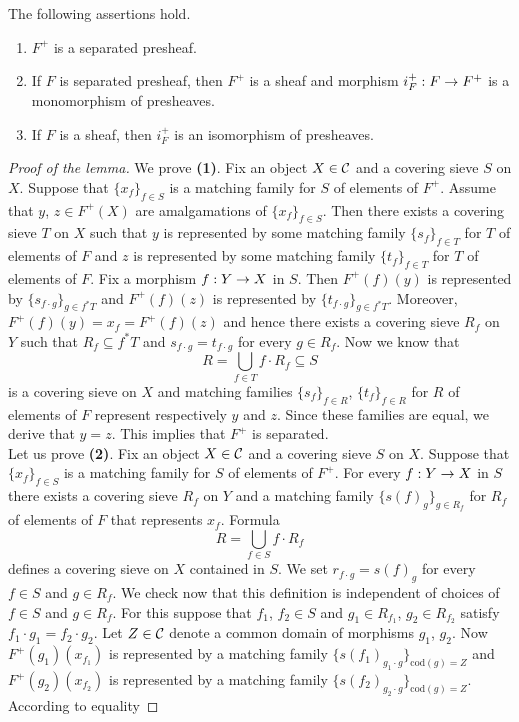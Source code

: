 \begin{lemma}\label{lemma:plusconstruction}
The following assertions hold.
\begin{enumerate}[label=\emph{\textbf{(\arabic*)}}, leftmargin=1.5em]
\item $F^+$ is a separated presheaf.
\item If $F$ is separated presheaf, then $F^+$ is a sheaf and morphism $i^+_F:F\rightarrow F^+$ is a monomorphism of presheaves.
\item If $F$ is a sheaf, then $i^+_F$ is an isomorphism of presheaves.
\end{enumerate}
\end{lemma}
\begin{proof}[Proof of the lemma]
We prove \textbf{(1)}. Fix an object $X\in {\mathcal C}$ and a covering sieve $S$ on $X$. Suppose that $\{x_f\}_{f\in S}$ is a matching family for $S$ of elements of $F^+$. Assume that $y$, $z\in F^+(X)$ are amalgamations of $\{x_f\}_{f\in S}$. Then there exists a covering sieve $T$ on $X$ such that $y$ is represented by some matching family $\{s_f\}_{f\in T}$ for $T$ of elements of $F$ and $z$ is represented by some matching family $\{t_f\}_{f\in T}$ for $T$ of elements of $F$. Fix a morphism $f:Y\rightarrow X$ in $S$. Then $F^+(f)(y)$ is represented by $\{s_{f\cdot g}\}_{g\in f^*T}$ and $F^+(f)(z)$ is represented by $\{t_{f\cdot g}\}_{g\in f^*T}$. Moreover, $F^+(f)(y)=x_f=F^+(f)(z)$ and hence there exists a covering sieve $R_f$ on $Y$ such that $R_f\subseteq f^*T$ and $s_{f\cdot g}=t_{f\cdot g}$ for every $g\in R_f$. Now we know that 
$$R=\bigcup_{f\in T}f\cdot R_f\subseteq S$$
is a covering sieve on $X$ and matching families $\{s_f\}_{f\in R}$, $\{t_f\}_{f\in R}$ for $R$ of elements of $F$ represent respectively $y$ and $z$. Since these families are equal, we derive that $y=z$. This implies that $F^+$ is separated.\\
Let us prove \textbf{(2)}. Fix an object $X\in {\mathcal C}$ and a covering sieve $S$ on $X$. Suppose that $\{x_f\}_{f\in S}$ is a matching family for $S$ of elements of $F^+$. For every $f:Y\rightarrow X$ in $S$ there exists a covering sieve $R_f$ on $Y$ and a matching family $\{s(f)_g\}_{g\in R_f}$ for $R_f$ of elements of $F$ that represents $x_f$. Formula
$$R=\bigcup_{f\in S}f\cdot R_f$$
defines a covering sieve on $X$ contained in $S$. We set $r_{f\cdot g}=s(f)_g$ for every $f\in S$ and $g\in R_f$. We check now that this definition is independent of choices of $f\in S$ and $g\in R_f$. For this suppose that $f_1$, $f_2\in S$ and $g_1\in R_{f_1}$, $g_2\in R_{f_2}$ satisfy $f_1\cdot g_1=f_2\cdot g_2$. Let $Z\in {\mathcal C}$ denote a common domain of morphisms $g_1$, $g_2$. Now $F^+(g_1)(x_{f_1})$ is represented by a matching family $\{s(f_1)_{g_1\cdot g}\}_{\mathrm{cod}(g)=Z}$ and $F^+(g_2)(x_{f_2})$ is represented by a matching family $\{s(f_2)_{g_2\cdot g}\}_{\mathrm{cod}(g)=Z}$. According to equality

\end{proof}
